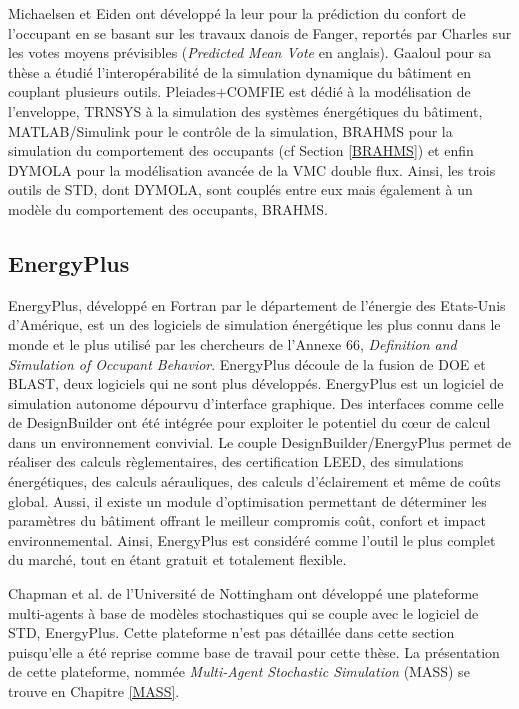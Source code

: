 Michaelsen et Eiden \cite{Michaelsen-09} ont développé la leur pour la prédiction du confort de l'occupant en se basant sur les travaux danois de Fanger, reportés par Charles \cite{Charles-03} sur les votes moyens prévisibles (\textit{Predicted Mean Vote} en anglais). Gaaloul \cite{Gaaloul-12} pour sa thèse a étudié l'interopérabilité de la simulation dynamique du bâtiment en couplant plusieurs outils. Pleiades+COMFIE est dédié à la modélisation de l'enveloppe, TRNSYS à la simulation des systèmes énergétiques du bâtiment, MATLAB/Simulink pour le contrôle de la simulation, BRAHMS pour la simulation du comportement des occupants (cf Section \ref{BRAHMS}) et enfin DYMOLA pour la modélisation avancée de la VMC double flux. Ainsi, les trois outils de STD, dont DYMOLA, sont couplés entre eux mais également à un modèle du comportement des occupants, BRAHMS.

\subsection*{EnergyPlus}

EnergyPlus, développé en Fortran par le département de l'énergie des Etats-Unis d'Amérique, est un des logiciels de simulation énergétique les plus connu dans le monde \cite{Sousa-13} et le plus utilisé par les chercheurs de l'Annexe 66, \textit{Definition and Simulation of Occupant Behavior}. EnergyPlus découle de la fusion de DOE et BLAST, deux logiciels qui ne sont plus développés. EnergyPlus est un logiciel de simulation autonome dépourvu d'interface graphique. Des interfaces comme celle de DesignBuilder ont été intégrée pour exploiter le potentiel du cœur de calcul dans un environnement convivial. Le couple DesignBuilder/EnergyPlus permet de réaliser des calculs règlementaires, des certification LEED, des simulations énergétiques, des calculs aérauliques, des calculs d'éclairement et même de coûts global. Aussi, il existe un module d'optimisation permettant de déterminer les paramètres du bâtiment offrant le meilleur compromis coût, confort et impact environnemental. Ainsi, EnergyPlus est considéré comme l'outil le plus complet du marché, tout en étant gratuit et totalement flexible.

Chapman et al. \cite{Chapman-14} de l'Université de Nottingham ont développé une plateforme multi-agents à base de modèles stochastiques qui se couple avec le logiciel de STD, EnergyPlus. Cette plateforme n'est pas détaillée dans cette section puisqu'elle a été reprise comme base de travail pour cette thèse. La présentation de cette plateforme, nommée \textit{Multi-Agent Stochastic Simulation} (MASS) se trouve en Chapitre \ref{MASS}.

